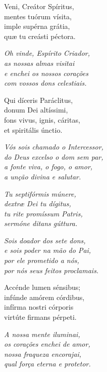 \begin{paracol}{2}
  Veni, Creátor Spíritus, \\
  mentes tuórum vísita, \\
  imple supérna grátia, \\
  qu{\ae} tu creásti péctora.

  \switchcolumn

  \emph{Oh vinde, Espírito Criador, \\
    as nossas almas visitai \\
    e enchei os nossos corações \\
    com vossos dons celestiais.}

  \switchcolumn*

  Qui díceris Paráclitus, \\
  donum Dei altíssimi, \\
  fons vivus, ignis, cáritas, \\
  et spiritális únctio.

  \switchcolumn

  \emph{Vós sois chamado o Intercessor, \\
    do Deus excelso o dom sem par, \\
    a fonte viva, o fogo, o amor, \\
    a unção divina e salutar.}

  \switchcolumn*

  \emph{Tu septifórmis múnere, \\
    dextr{\ae} Dei tu dígitus, \\
    tu rite promíssum Patris, \\
    sermóne ditans gúttura.}

  \switchcolumn

  \emph{Sois doador dos sete dons, \\
    e sois poder na mão do Pai, \\
    por ele prometido a nós, \\
    por nós seus feitos proclamais.}

  \switchcolumn*

  Accénde lumen sénsibus; \\
  infúnde amórem córdibus, \\
  infírma nostri córporis \\
  virtúte firmans pérpeti.

  \switchcolumn

  \emph{A nossa mente iluminai, \\
    os corações enchei de amor, \\
    nossa fraqueza encorajai, \\
    qual força eterna e protetor.}


\end{paracol}
